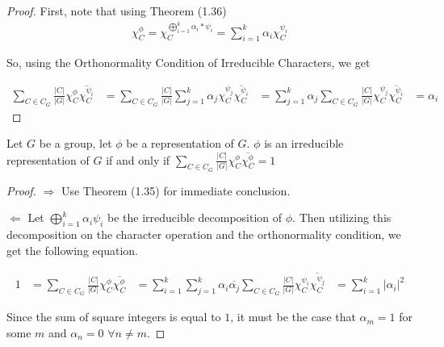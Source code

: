 \noindent \begin{proof}\cite{Tung}  First, note that using Theorem (1.36)
\begin{equation}
	\begin{aligned}
		\chi^\phi_C = \chi^{ \bigoplus_{i=1}^k \alpha_i *\psi_i}_C = \sum_{i=1}^k \alpha_i \chi^{\psi_i}_C
	\end{aligned}
\end{equation}

So, using the Orthonormality Condition of Irreducible Characters, we get 

\begin{equation}
	\begin{aligned}
\sum_{C\in C_G} \frac{|C|}{|G|}\chi^\phi_C \overline{\chi^{\psi_i}_C} &= \sum_{C\in C_G} \frac{|C|}{|G|} \sum_{j=1}^k \alpha_j \chi^{\psi_j}_C \overline{\chi^{\psi_i}_C} &= \sum_{j=1}^k \alpha_j \sum_{C\in C_G} \frac{|C|}{|G|} \chi^{\psi_j}_C \overline{\chi^{\psi_i}_C}  &= \alpha_i 
	\end{aligned}
\end{equation}
\end{proof}

\begin{theorem}
	Let $G$ be a group, let $\phi$ be a representation of $G$. $\phi$ is an irreducible representation of $G$ if and only if $\sum_{C\in C_G} \frac{|C|}{|G|}\chi^\phi_C \overline{\chi^\phi_C} = 1$
\end{theorem}

\noindent \begin{proof}\cite{Tung}  $\Rightarrow$ Use Theorem (1.35) for immediate conclusion. 

\hspace{2mm}$\Leftarrow$ Let $\bigoplus_{i=1}^k \alpha_i\psi_i$ be the irreducible decomposition of $\phi$. Then utilizing this decomposition on the character operation and the orthonormality condition, we get the following equation.

\begin{equation}
	\begin{aligned}
		1 &=\sum_{C\in C_G} \frac{|C|}{|G|}\chi^\phi_C \overline{\chi^\phi_C} &= \sum_{i=1}^k \sum_{j=1}^k \alpha_i \overline{\alpha_j} \sum_{C\in C_G} \frac{|C|}{|G|} \chi^{\psi_i}_C \overline{\chi^{\psi_j}_C} &= \sum_{i=1}^k |\alpha_i|^2
	\end{aligned}
\end{equation}

Since the sum of square integers is equal to $1$, it must be the case that $\alpha_m = 1$ for some $m$ and $\alpha_n=0$  $\forall n \neq m$.  \end{proof}


